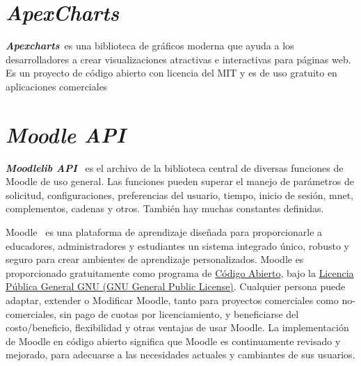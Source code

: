 \section{\textit{ApexCharts}}
\textbf{\textit{Apexcharts}}~\cite{ApexChart}es una biblioteca de gráficos moderna que ayuda a los desarrolladores a crear visualizaciones atractivas e interactivas para páginas web.
Es un proyecto de código abierto con licencia del MIT y es de uso gratuito en aplicaciones comerciales

\section{\textit{Moodle API}}
\textbf{\textit{Moodlelib API}}~\cite{MoodleAPI} es el archivo de la biblioteca central de diversas funciones de Moodle de uso general. Las funciones pueden superar el manejo de parámetros de solicitud, configuraciones, preferencias del usuario, tiempo, inicio de sesión, mnet, complementos, cadenas y otros. También hay muchas constantes definidas.

Moodle~\cite{Moodle} es una plataforma de aprendizaje diseñada para proporcionarle a educadores, administradores y estudiantes un sistema integrado único, robusto y seguro para crear ambientes de aprendizaje personalizados. 
Moodle es proporcionado gratuitamente como programa de \href{https://opensource.org/docs/osd}{Código Abierto}, bajo la \href{https://docs.moodle.org/dev/License}{Licencia Pública General GNU (GNU General Public License)}. Cualquier persona puede adaptar, extender o Modificar Moodle, tanto para proyectos comerciales como no-comerciales, sin pago de cuotas por licenciamiento, y beneficiarse del costo/beneficio, flexibilidad y otras ventajas de usar Moodle. La implementación de Moodle en código abierto significa que Moodle es continuamente revisado y mejorado, para adecuarse a las necesidades actuales y cambiantes de sus usuarios.


